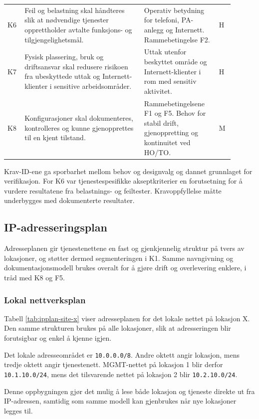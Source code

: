 \begin{longtable}{@{}>{\raggedright\arraybackslash}p{0.055\linewidth} >{\raggedright\arraybackslash}p{0.48\linewidth} >{\raggedright\arraybackslash}p{0.30\linewidth} >{\centering\arraybackslash}p{0.065\linewidth}@{}}
K6 & Feil og belastning skal håndteres slik at nødvendige tjenester opprettholder avtalte funksjons- og tilgjengelighetsmål. & Operativ betydning for telefoni, PA-anlegg og Internett. Rammebetingelse F2. & H \\
\addlinespace
K7 & Fysisk plassering, bruk og driftsansvar skal redusere risikoen fra ubeskyttede uttak og Internett-klienter i sensitive arbeidsområder. & Uttak utenfor beskyttet område og Internett-klienter i rom med sensitiv aktivitet. & H \\
\addlinespace
K8 & Konfigurasjoner skal dokumenteres, kontrolleres og kunne gjenopprettes til en kjent tilstand. & Rammebetingelsene F1 og F5. Behov for stabil drift, gjenoppretting og kontinuitet ved HO/TO. & M \\
\end{longtable}
\endgroup

Krav-ID-ene ga sporbarhet mellom behov og designvalg og dannet grunnlaget for verifikasjon. For K6 var tjenestespesifikke akseptkriterier en forutsetning for å vurdere resultatene fra belastnings- og feiltester. Kravoppfyllelse måtte underbygges med dokumenterte resultater.

\subsection{IP-adresseringsplan}
Adresseplanen gir tjenestenettene en fast og gjenkjennelig struktur på tvers av lokasjoner, og støtter dermed segmenteringen i K1. Samme navngivning og dokumentasjonsmodell brukes overalt for å gjøre drift og overlevering enklere, i tråd med K8 og F5.

\subsubsection{Lokal nettverksplan}
Tabell \ref{tab:ipplan-site-x} viser adresseplanen for det lokale nettet på lokasjon X. Den samme strukturen brukes på alle lokasjoner, slik at adresseringen blir forutsigbar og enkel å kjenne igjen.

Det lokale adresseområdet er \texttt{10.0.0.0/8}. Andre oktett angir lokasjon, mens tredje oktett angir tjenestenett. MGMT-nettet på lokasjon 1 blir derfor \texttt{10.1.10.0/24}, mens det tilsvarende nettet på lokasjon 2 blir \texttt{10.2.10.0/24}.

Denne oppbygningen gjør det mulig å lese både lokasjon og tjeneste direkte ut fra IP-adressen, samtidig som samme modell kan gjenbrukes når nye lokasjoner legges til.

